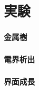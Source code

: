 \documentclass[autodetect-engine,dvi=dvipdfmx,a4paper,ja=standard,oneside,openany,11pt,draft]{bxjsarticle}
\begin{document}
\part{実験}
\section{金属樹}
\section{電界析出}
\section{界面成長}

\ifdraft{
  
  
}{}
\end{document}
